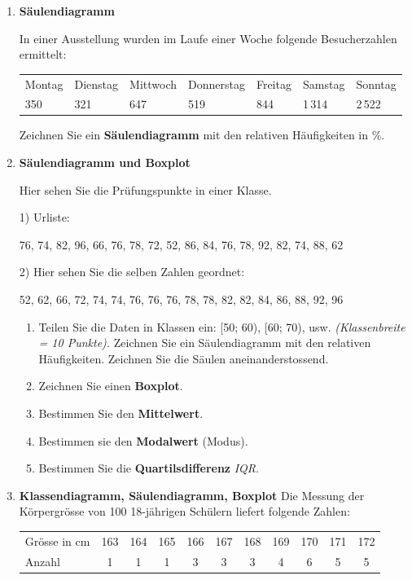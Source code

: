 \begin{enumerate}
\item \textbf{Säulendiagramm}

  In einer Ausstellung wurden im Laufe einer Woche folgende
  Besucherzahlen ermittelt:

  \begin{tabular}{lllllll}
    Montag & Dienstag & Mittwoch & Donnerstag & Freitag & Samstag & Sonntag \\
    350    & 321      & 647      & 519        & 844     & 1\,314  & 2\,522
  \end{tabular}

  Zeichnen Sie ein \textbf{Säulendiagramm} mit den relativen
  Häufigkeiten in \%.

\item \textbf{Säulendiagramm und Boxplot}

  Hier sehen Sie die Prüfungspunkte in einer Klasse.

  1) Urliste:

  76, 74, 82, 96, 66, 76, 78, 72, 52, 86, 84, 76, 78, 92, 82, 74, 88,
  62

  2) Hier sehen Sie die selben Zahlen geordnet:

  52, 62, 66, 72, 74, 74, 76, 76, 76, 78, 78, 82, 82, 84, 86, 88, 92, 96

  \begin{enumerate}[label=\alph*)]
  \item
    Teilen Sie die Daten in Klassen ein: [50; 60), [60; 70), usw.
        \textit{(Klassenbreite = 10 Punkte).} Zeichnen Sie ein
        Säulendiagramm mit den relativen Häufigkeiten. Zeichnen Sie
        die Säulen aneinanderstossend.

      \item
        Zeichnen Sie einen \textbf{Boxplot}.
      \item
        Bestimmen Sie den \textbf{Mittelwert}.
      \item
        Bestimmen sie den \textbf{Modalwert} (Modus).
      \item
        Bestimmen Sie die \textbf{Quartilsdifferenz} \textit{IQR}.
    \end{enumerate}

\item \textbf{Klassendiagramm, Säulendiagramm, Boxplot}
 Die Messung der Körpergrösse von 100 18-jährigen Schülern liefert
 folgende Zahlen:

 \begin{tabular}{lcccccccccc}
   Grösse in cm & 163 & 164 & 165 & 166 & 167 & 168 & 169 & 170 & 171 & 172\\
   Anzahl      &  1  &  1  &  1  &  3  &  3  &  3  &  4  &  6  &  5  &  5
   \end{tabular}


\end{enumerate}
